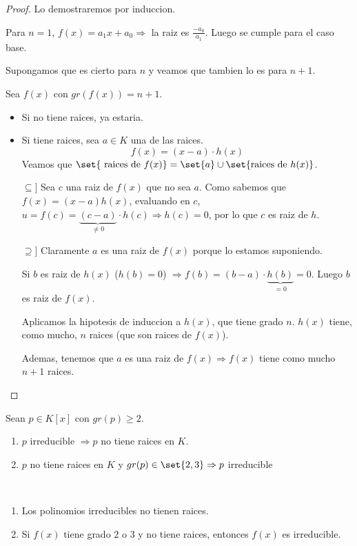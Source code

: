 \begin{proof}
	Lo demostraremos por induccion.
	
	Para \(n = 1 \), \(f(x) = a_1 x + a_0 \Rightarrow\) la raiz es \(\frac{-a_0}{a_1}\). Luego se cumple para el caso base.
	
	Supongamos que es cierto para \(n \) y veamos que tambien lo es para \(n + 1 \).
	
	Sea \(f(x )\) con \(gr(f(x)) = n + 1 \).
	\begin{itemize}
		\item Si no tiene raices, ya estaria.
		\item Si tiene raices, sea \(a \in K \) una de las raices.
		      \[
			      f(x) = (x - a) \cdot h(x )
		      \]
		      Veamos que \(\set{\text{ raices de }f(x) } = \set{a} \cup \set{\text{raices de } h(x) }\).
		      
		      \(\subseteq ]\) Sea \(c \) una raiz de \(f(x )\) que no sea \( a \). Como sabemos que \(f(x) = (x-a)h (x)\), evaluando en \(c \), \(u = f(c) = \underbrace{(c - a )}_{\neq 0} \cdot h(c) \Rightarrow h(c) = 0\), por lo que \(c \) es raiz de \(h \).
		      
		      \(\supseteq ] \) Claramente \( a \) es una raiz de \(f(x )\) porque lo estamos suponiendo.
		      
		      Si \(b \) es raiz de \(h(x )\) (\(h(b) = 0\)) \(\Rightarrow f(b) = (b-a) \cdot \underbrace{h(b)}_{= 0} = 0\). Luego \(b \) es raiz de \(f(x )\).
		      
		      Aplicamos la hipotesis de induccion a \(h(x )\), que tiene grado \(n \). \(h(x )\) tiene, como mucho, \(n \) raices (que son raices de \(f(x )\)).
		      
		      Ademas, tenemos que \(a \) es una raiz de \(f(x ) \Rightarrow f(x)\) tiene como mucho \(n + 1 \) raices.
	\end{itemize}
\end{proof}
\begin{corollary}
	Sean \(p \in K[x ]\) con \(gr(p) \geq 2 \).
	\begin{enumerate}
		\item \(p \) irreducible \(\Rightarrow p \) no tiene raices en \(K \).
		\item \(p \) no tiene raices en \(K \) y \(gr(p) \in \set{2,3} \Rightarrow p\) irreducible
	\end{enumerate}
\end{corollary}
\begin{remark}
	~\begin{enumerate}
		\item Los polinomios irreducibles no tienen raices.
		\item Si \(f(x )\) tiene grado \(2 \) o \(3 \) y no tiene raices, entonces \(f(x )\) es irreducible.
	\end{enumerate}
\end{remark}
